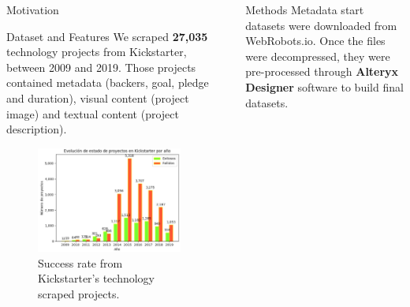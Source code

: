 \documentclass[final]{beamer}
\newlength{\sepwid}
\newlength{\onecolwid}
\begin{document}
\begin{frame}[t]
\begin{columns}[t]
\begin{column}{\onecolwid}
\begin{block}{Motivation}
\end{block}

\begin{block}{Dataset and Features}
	We scraped \textbf{27,035} technology projects from Kickstarter, between 2009 and 2019. Those projects contained metadata (backers, goal, pledge and duration), visual content (project image) and textual content (project description).
	\begin{figure}
		\includegraphics[width=0.75\linewidth]{scraped_projects.jpg}
		\caption{Success rate from Kickstarter's technology scraped projects.}
	\end{figure}
	
\end{block}


\end{column} %

\begin{column}{\sepwid}\end{column} %



\begin{column}{\onecolwid} %
	\begin{block}{Methods}
	Metadata start datasets were downloaded from WebRobots.io. Once the files were decompressed, they were pre-processed through \textbf{Alteryx Designer} software to build final datasets.
		

\end{block}
\end{column}
\end{columns}
\end{frame}
\end{document}
